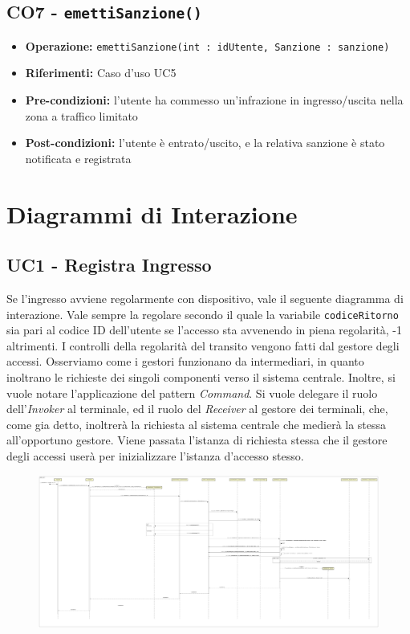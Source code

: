 \documentclass[12pt, letterpaper]{article}
\begin{document}
\subsection{CO7 - \texttt{emettiSanzione()}}
\begin{itemize}
    \item \textbf{Operazione:} 
    \texttt{emettiSanzione(int : idUtente, Sanzione : sanzione)}
    \item \textbf{Riferimenti:} Caso d'uso UC5
    \item \textbf{Pre-condizioni:} l'utente ha commesso 
    un'infrazione in ingresso/uscita nella zona a traffico 
    limitato
    \item \textbf{Post-condizioni:} l'utente 
    è entrato/uscito, e la relativa sanzione è stato 
    notificata e registrata
\end{itemize}

\section{Diagrammi di Interazione}

\subsection{UC1 - Registra Ingresso}
Se l'ingresso avviene regolarmente con dispositivo,
vale il seguente diagramma di interazione.
Vale sempre la regolare secondo il quale la variabile 
\texttt{codiceRitorno} sia pari al codice ID dell'utente 
se l'accesso sta avvenendo in piena regolarità, -1 
altrimenti. I controlli della regolarità del transito 
vengono fatti dal gestore degli accessi.
Osserviamo come i gestori funzionano da intermediari, 
in quanto inoltrano le richieste dei singoli componenti 
verso il sistema centrale.
Inoltre, si vuole notare l'applicazione del pattern 
\emph{Command}. Si vuole delegare il ruolo 
dell'\emph{Invoker} al terminale, ed il ruolo del 
\emph{Receiver} al gestore dei terminali, che, 
come gia detto, inoltrerà la richiesta al sistema 
centrale che medierà la stessa all'opportuno gestore.
Viene passata l'istanza di richiesta stessa che il 
gestore degli accessi userà per inizializzare 
l'istanza d'accesso stesso.
\begin{figure}[H]
    \centering
    \includegraphics[scale=0.07]{UC1-ID}
\end{figure} 
\end{document}
